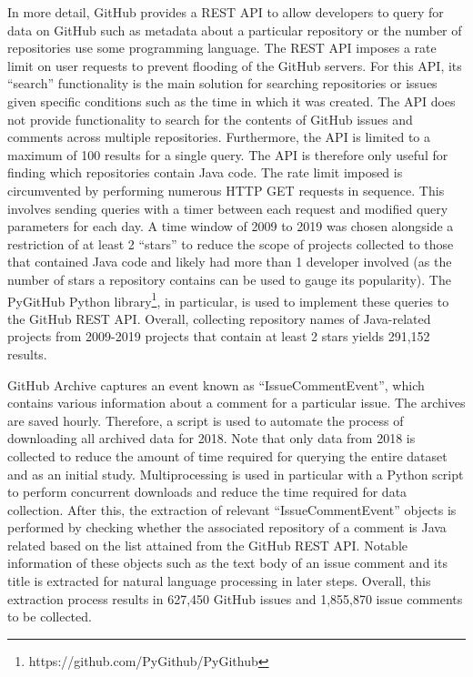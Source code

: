 In more detail, GitHub provides a REST API to allow developers to query for data on GitHub such as metadata about a particular repository or the number of repositories use some programming language. The REST API imposes a rate limit on user requests to prevent flooding of the GitHub servers. For this API, its  ``search'' functionality is the main solution for searching repositories or issues given specific conditions such as the time in which it was created. The API does not provide functionality to search for the contents of GitHub issues and comments across multiple repositories. Furthermore, the API is limited to a maximum of 100 results for a single query. The API is therefore only useful for finding which repositories contain Java code. The rate limit imposed is circumvented by performing numerous HTTP GET requests in sequence. This involves sending queries with a timer between each request and modified query parameters for each day. A time window of 2009 to 2019 was chosen alongside a restriction of at least 2 ``stars'' to reduce the scope of projects collected to those that contained Java code and likely had more than 1 developer involved (as the number of stars a repository contains can be used to gauge its popularity). The PyGitHub Python library\footnote{https://github.com/PyGithub/PyGithub}, in particular, is used to implement these queries to the GitHub REST API. Overall, collecting repository names of Java-related projects from 2009-2019 projects that contain at least 2 stars yields 291,152 results. \bigbreak

GitHub Archive captures an event known as ``IssueCommentEvent'', which contains various information about a comment for a particular issue. The archives are saved hourly. Therefore, a script is used to automate the process of downloading all archived data for 2018. Note that only data from 2018 is collected to reduce the amount of time required for querying the entire dataset and as an initial study. Multiprocessing is used in particular with a Python script to perform concurrent downloads and reduce the time required for data collection. After this, the extraction of relevant ``IssueCommentEvent'' objects is performed by checking whether the associated repository of a comment is Java related based on the list attained from the GitHub REST API. Notable information of these objects such as the text body of an issue comment and its title is extracted for natural language processing in later steps. Overall, this extraction process results in 627,450 GitHub issues and 1,855,870 issue comments to be collected.

